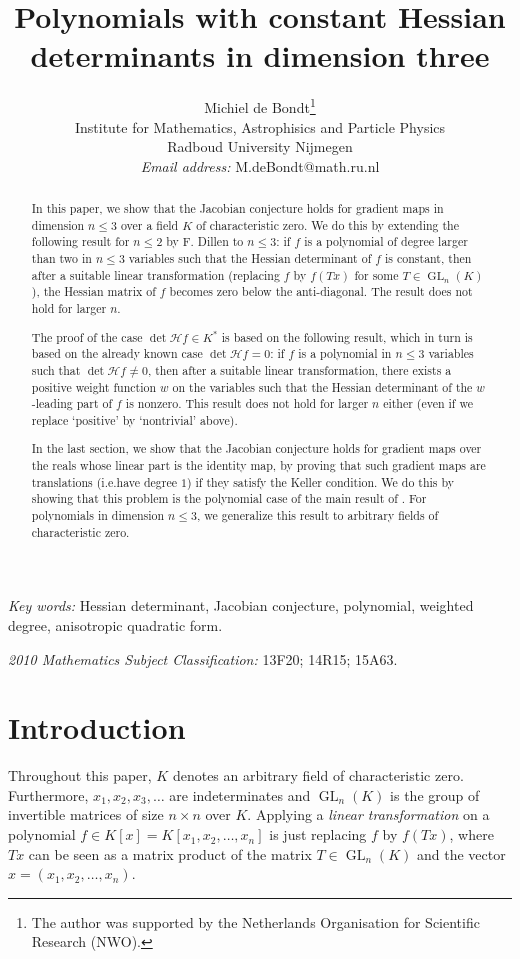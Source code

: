 \documentclass[10pt]{article}
\title{Polynomials with constant Hessian determinants in dimension three}
\author{Michiel de Bondt\footnote{The author was supported by the Netherlands 
        Organisation for Scientific Research (NWO).} \\
        Institute for Mathematics, Astrophisics and Particle Physics \\
        Radboud University Nijmegen \\
        \emph{Email address:} M.deBondt@math.ru.nl}
\theoremstyle{remark}
\theoremstyle{definition}
\newcommand{\hess}{{\mathcal H}}
\newcommand{\GL}{\operatorname{GL}}
\begin{document}
\maketitle

\begin{abstract}
\noindent
In this paper, we show that the Jacobian conjecture holds for gradient maps
in dimension $n \le 3$ over a field $K$ of characteristic zero. We do this by 
extending the following result for $n \le 2$ by F. Dillen to $n \le 3$:
if $f$ is a polynomial of degree larger than two in $n \le 3$ variables such that the 
Hessian determinant of $f$ is constant, then after a suitable linear transformation 
(replacing $f$ by $f(Tx)$ for some $T \in \GL_n(K)$), the Hessian 
matrix of $f$ becomes zero below the anti-diagonal. The result does not hold for larger $n$.

The proof of the case $\det \hess f \in K^{*}$ is based on the following result, 
which in turn is based on the already known case $\det \hess f = 0$: 
if $f$ is a polynomial in $n \le 3$ variables such that $\det \hess f \ne 0$, 
then after a suitable linear transformation, there exists a positive weight function $w$ 
on the variables such that the Hessian determinant of the $w$-leading part of $f$ is nonzero. 
This result does not hold for larger $n$ either (even if we replace `positive' by `nontrivial'
above).

In the last section, we show that the Jacobian conjecture holds for
gradient maps over the reals whose linear part is the identity map, by proving that 
such gradient maps are translations (i.e.\@ have degree $1$) if they satisfy 
the Keller condition. We do this by showing that this problem is the polynomial case of 
the main result of \cite{MR0319126}. For polynomials in dimension $n \le 3$, we generalize 
this result to arbitrary fields of characteristic zero.
\end{abstract}

\noindent
\emph{Key words:} Hessian determinant, Jacobian conjecture, polynomial, weighted degree,
anisotropic quadratic form.

\medskip
\noindent 
\emph{2010 Mathematics Subject Classification:} 13F20; 14R15; 15A63.


\section{Introduction}

Throughout this paper, $K$ denotes an arbitrary field of characteristic zero.
Furthermore, $x_1, x_2, x_3, \ldots$ are indeterminates and $\GL_n(K)$ is the 
group of invertible matrices of size $n \times n$ over $K$. Applying a 
\emph{linear transformation} on a polynomial $f \in K[x] = K[x_1,x_2,\ldots,x_n]$ is
just replacing $f$ by $f(Tx)$, where $Tx$ can be seen as a matrix product of the matrix 
$T \in \GL_n(K)$ and the vector $x = (x_1,x_2,\ldots,x_n)$.
\end{document}
